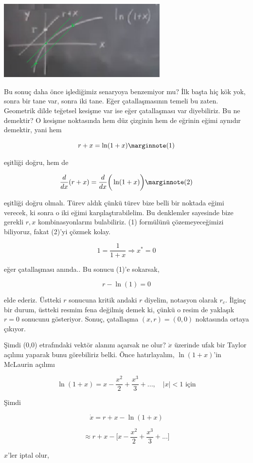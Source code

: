 \documentclass[12pt,fleqn]{article}\usepackage{../../common}
\begin{document}
\includegraphics[height=4cm]{02_17.png}

Bu sonuç daha önce işlediğimiz senaryoya benzemiyor mu? İlk başta hiç kök yok,
sonra bir tane var, sonra iki tane. Eğer çatallaşmasının temeli bu
zaten. Geometrik dilde teğetsel kesişme var ise eğer çatallaşması var
diyebiliriz. Bu ne demektir? O kesişme noktasında hem düz çizginin hem de
eğrinin eğimi aynıdır demektir, yani hem

$$ r + x = \ln(1+x) 
\mlabel{1} $$

eşitliği doğru, hem de

$$
\frac{d}{dx} (r + x) = \frac{d}{dx} \bigg( \ln (1+x) \bigg)
\mlabel{2}
$$

eşitliği doğru olmalı. Türev aldık çünkü türev bize belli bir noktada eğimi
verecek, ki sonra o iki eğimi karşılaştırabilelim. Bu denklemler sayesinde bize
gerekli $r,x$ kombinasyonlarını bulabiliriz. (1) formülünü çözemeyeceğimizi
biliyoruz, fakat (2)'yi çözmek kolay.

$$ 1 = \frac{1}{1+x}  \Rightarrow x^* = 0 $$

eğer çatallaşması anında.. Bu sonucu (1)'e sokarsak,

$$ r  - \ln(1)  = 0$$

elde ederiz. Üstteki $r$ sonucuna kritik andaki $r$ diyelim, notasyon olarak
$r_c$. İlginç bir durum, üstteki resmim fena değilmiş demek ki, çünkü o resim de
yaklaşık $r=0$ sonucunu gösteriyor. Sonuç, çatallaşma $(x,r)=(0,0)$ noktasında
ortaya çıkıyor.

Şimdi (0,0) etrafındaki vektör alanını açarsak ne olur? $\dot{x}$ üzerinde ufak
bir Taylor açılımı yaparak bunu görebiliriz belki. Önce hatırlayalım,
$\ln(1+x)$'in McLaurin açılımı

$$ \ln (1+x) = x - \frac{x^2}{2} + \frac{x^3}{3} + ... , \quad |x|<1 \textrm{ için}$$

Şimdi

$$ \dot{x} = r + x - \ln(1+x)$$

$$ \approx r + x - \big[ x - \frac{x^2}{2} + \frac{x^3}{3} + ... \big] $$

$x$'ler iptal olur,
\end{document}
